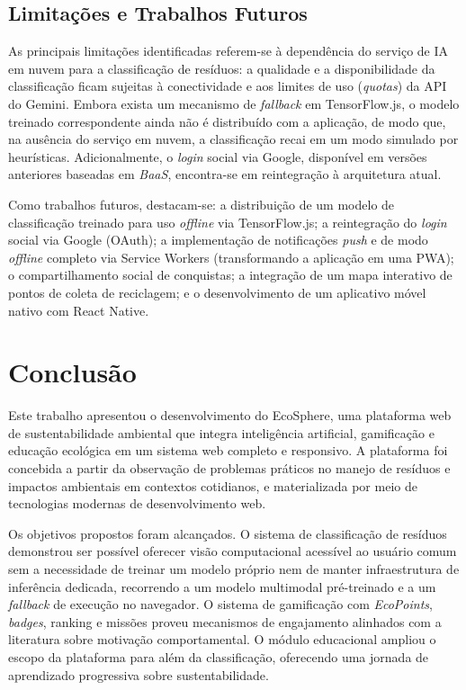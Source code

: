 \documentclass[
	12pt,
	openright,
	oneside,
	a4paper,
	chapter=TITLE,
	section=TITLE,
	subsection=TITLE,
	subsubsection=TITLE,
	english,
	brazil
	]{abntex2}
\begin{document}
\section{Limitações e Trabalhos Futuros}

As principais limitações identificadas referem-se à dependência do serviço de IA em nuvem para a classificação de resíduos: a qualidade e a disponibilidade da classificação ficam sujeitas à conectividade e aos limites de uso (\textit{quotas}) da API do Gemini. Embora exista um mecanismo de \textit{fallback} em TensorFlow.js, o modelo treinado correspondente ainda não é distribuído com a aplicação, de modo que, na ausência do serviço em nuvem, a classificação recai em um modo simulado por heurísticas. Adicionalmente, o \textit{login} social via Google, disponível em versões anteriores baseadas em \textit{BaaS}, encontra-se em reintegração à arquitetura atual.

Como trabalhos futuros, destacam-se: a distribuição de um modelo de classificação treinado para uso \textit{offline} via TensorFlow.js; a reintegração do \textit{login} social via Google (OAuth); a implementação de notificações \textit{push} e de modo \textit{offline} completo via Service Workers (transformando a aplicação em uma PWA); o compartilhamento social de conquistas; a integração de um mapa interativo de pontos de coleta de reciclagem; e o desenvolvimento de um aplicativo móvel nativo com React Native.

\chapter{Conclusão}

Este trabalho apresentou o desenvolvimento do EcoSphere, uma plataforma web de sustentabilidade ambiental que integra inteligência artificial, gamificação e educação ecológica em um sistema web completo e responsivo. A plataforma foi concebida a partir da observação de problemas práticos no manejo de resíduos e impactos ambientais em contextos cotidianos, e materializada por meio de tecnologias modernas de desenvolvimento web.

Os objetivos propostos foram alcançados. O sistema de classificação de resíduos demonstrou ser possível oferecer visão computacional acessível ao usuário comum sem a necessidade de treinar um modelo próprio nem de manter infraestrutura de inferência dedicada, recorrendo a um modelo multimodal pré-treinado e a um \textit{fallback} de execução no navegador. O sistema de gamificação com \textit{EcoPoints}, \textit{badges}, ranking e missões proveu mecanismos de engajamento alinhados com a literatura sobre motivação comportamental. O módulo educacional ampliou o escopo da plataforma para além da classificação, oferecendo uma jornada de aprendizado progressiva sobre sustentabilidade.
\end{document}
